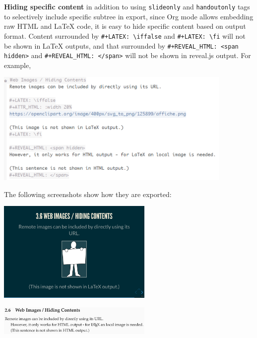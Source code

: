 \documentclass[10pt,article]{article}
\begin{document}
\textbf{Hiding specific content} in addition to using \texttt{slideonly} and \texttt{handoutonly}
tags to selectively include specific subtree in export, since Org mode allows
embedding raw HTML and \LaTeX{} code, it is easy to hide specific content based
on output format. Content surrounded by \texttt{\#+LATEX: \textbackslash{}iffalse} and \texttt{\#+LATEX: \textbackslash{}fi}
will not be shown in \LaTeX{} outputs, and that surrounded by \texttt{\#+REVEAL\_HTML:
<span hidden>} and \texttt{\#+REVEAL\_HTML: </span>} will not be shown in reveal.js
output. For example, 

\begin{center}
\includegraphics[height=5.5cm]{../../../Assets/Images/Org-Teaching/Quickstart_Lecture-Editing_Hiding-Contents.png}
\end{center}

The following screenshots show how they are exported:

\begin{multicols}{2}
\begin{center}
\includegraphics[width=7.5cm]{../../../Assets/Images/Org-Teaching/Quickstart_Lecture-Editing_Hiding-Contents-reveal.js.png}
\end{center}

\begin{center}
\includegraphics[width=7.5cm]{../../../Assets/Images/Org-Teaching/Quickstart_Lecture-Editing_Hiding-Contents-LaTeX.png}
\end{center}
\end{multicols}
\end{document}
